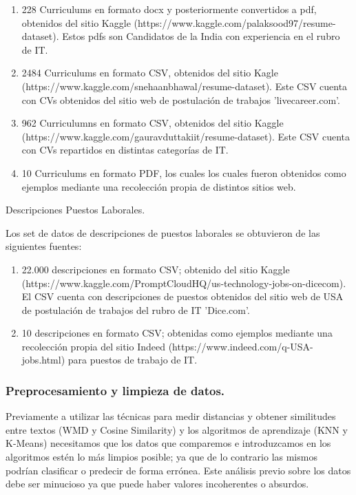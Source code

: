 \documentclass[12pt,a4paper]{article}
\makeatletter
\renewcommand\paragraph{\@startsection{paragraph}{4}{\z@}
            {-2.5ex\@plus -1ex \@minus -.25ex}
            {1.25ex \@plus .25ex}
            {\normalfont\normalsize\bfseries}}
\makeatother
\begin{document}
\begin{enumerate}
\item 228 Curriculums en formato docx y posteriormente convertidos a pdf, obtenidos del sitio Kaggle (https://www.kaggle.com/palaksood97/resume-dataset). Estos pdfs son Candidatos de la India con experiencia en el rubro de IT.
\item 2484 Curriculums en formato CSV, obtenidos del sitio Kagle (https://www.kaggle.com/snehaanbhawal/resume-dataset). Este CSV cuenta con CVs obtenidos del sitio web de postulación de trabajos 'livecareer.com'.
\item 962 Curriculumns en formato CSV, obtenidos del sitio Kaggle (https://www.kaggle.com/gauravduttakiit/resume-dataset). Este CSV cuenta con CVs repartidos en distintas categorías de IT.
\item 10 Curriculums en formato PDF, los cuales los cuales fueron obtenidos como ejemplos mediante una recolección propia de distintos sitios web. 
\end{enumerate}

\paragraph{Descripciones Puestos Laborales.}

Los set de datos de descripciones de puestos laborales se obtuvieron de las siguientes fuentes:

\begin{enumerate}
\item 22.000 descripciones en formato CSV; obtenido del sitio Kaggle (https://www.kaggle.com/PromptCloudHQ/us-technology-jobs-on-dicecom). El CSV cuenta con descripciones de puestos obtenidos del sitio web de USA de postulación de trabajos del rubro de IT 'Dice.com'.
\item 10 descripciones en formato CSV; obtenidas como ejemplos mediante una recolección propia del sitio Indeed (https://www.indeed.com/q-USA-jobs.html) para puestos de trabajo de IT.
\end{enumerate}
 

\subsubsection{Preprocesamiento y limpieza de datos.}
Previamente a utilizar las técnicas para medir distancias y obtener similitudes entre textos (WMD y Cosine Similarity) y los algoritmos de aprendizaje (KNN y K-Means) necesitamos que los datos que comparemos e introduzcamos en los algoritmos estén lo más limpios posible; ya que de lo contrario las mismos podrían clasificar o predecir de forma errónea. Este análisis previo sobre los datos debe ser minucioso ya que puede haber valores incoherentes o absurdos.
\end{document}
